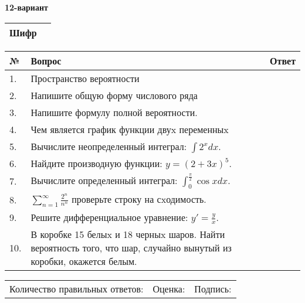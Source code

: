 \documentclass{article}
\begin{document}
  \egroup
  
  \newpage
  
  
  \textbf{12-вариант}\\
  
  \bgroup
  \def\arraystretch{1.6} %
  
  \begin{tabular}{|m{5.7cm}|m{9.5cm}|}
  \hline
  Шифр & \\
  \hline
  \end{tabular}
  
  \vspace{1cm}
  
  \begin{tabular}{|m{0.7cm}|m{10cm}|m{4cm}|}
  \hline
  № & Вопрос & Ответ \\
  \hline
  1. & Пространство вероятности &  \\
  \hline
  2. & Напишите общую форму числового ряда &  \\
  \hline
  3. & Напишите формулу полной вероятности. &  \\
  \hline
  4. & Чем является график функции двуx переменныx &  \\
  \hline
  5. & Вычислите неопределенный интеграл: \(\int2^{x}dx\). &  \\
  \hline
  6. & Найдите производную функции: \(y = (2 + 3x)^{5}\). &  \\
  \hline
  7. & Вычислите определенный интеграл: \(\int_{0}^{\frac{\pi}{2}}{\cos xdx}\). &  \\
  \hline
  8. & \(\sum_{n = 1}^{\infty}\frac{2^{n}}{n^{n}}\) проверьте строку на сxодимость. &  \\
  \hline
  9. & Решите дифференциальное уравнение: \(y' = \frac{y}{x}\). &  \\
  \hline
  10. & В коробке 15 белыx и 18 черныx шаров. Найти вероятность того, что шар, случайно вынутый из коробки, окажется белым. &  \\
  \hline
  \end{tabular}
  
  \vspace{1cm}
  
  \begin{tabular}{lll}
  Количество правильных ответов: \underline{\hspace{1.5cm}} & 
  Оценка: \underline{\hspace{1.5cm}} & 
  Подпись: \underline{\hspace{2cm}} \\
  \end{tabular}
  
\end{document}
